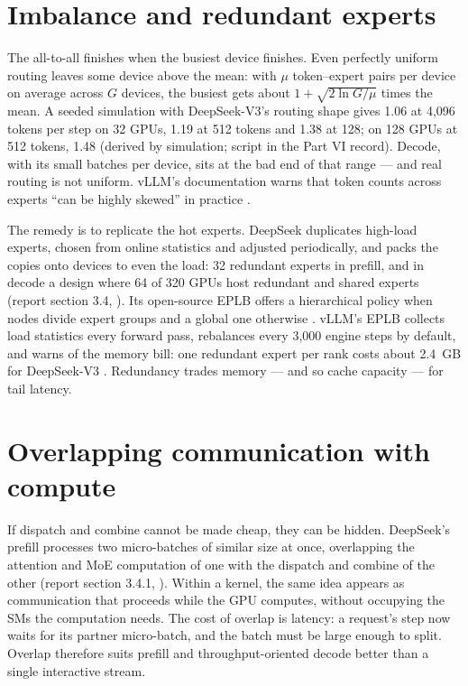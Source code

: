 \section{Imbalance and redundant experts}

The all-to-all finishes when the busiest device finishes. Even perfectly
uniform routing leaves some device above the mean: with $\mu$ token--expert
pairs per device on average across $G$ devices, the busiest gets about
$1 + \sqrt{2\ln G/\mu}$ times the mean. A seeded simulation with DeepSeek-V3's
routing shape gives 1.06 at 4,096 tokens per step on 32 GPUs, 1.19 at 512
tokens and 1.38 at 128; on 128 GPUs at 512 tokens, 1.48 (derived by
simulation; script in the Part VI record). Decode, with its small batches per
device, sits at the bad end of that range --- and real routing is not uniform.
vLLM's documentation warns that token counts across experts ``can be highly
skewed'' in practice \cite{vllm2026eplb}.

The remedy is to replicate the hot experts. DeepSeek duplicates high-load
experts, chosen from online statistics and adjusted periodically, and packs
the copies onto devices to even the load: 32 redundant experts in prefill,
and in decode a design where 64 of 320 GPUs host redundant and shared experts
(report section 3.4, \cite{deepseek2024v3}). Its open-source EPLB offers a
hierarchical policy when nodes divide expert groups and a global one otherwise
\cite{deepseek2025eplb}. vLLM's EPLB collects load statistics every forward
pass, rebalances every 3,000 engine steps by default, and warns of the memory
bill: one redundant expert per rank costs about 2.4~GB for DeepSeek-V3
\cite{vllm2026eplb}. Redundancy trades memory --- and so cache capacity ---
for tail latency.

\section{Overlapping communication with compute}

If dispatch and combine cannot be made cheap, they can be hidden. DeepSeek's
prefill processes two micro-batches of similar size at once, overlapping the
attention and MoE computation of one with the dispatch and combine of the
other (report section 3.4.1, \cite{deepseek2024v3}). Within a kernel, the
same idea appears as communication that proceeds while the GPU computes,
without occupying the SMs the computation needs. The cost of overlap is
latency: a request's step now waits for its partner micro-batch, and the batch
must be large enough to split. Overlap therefore suits prefill and
throughput-oriented decode better than a single interactive stream.

